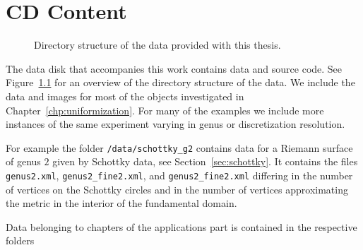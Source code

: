 \documentclass[Thesis]{subfiles}
\begin{document}
\chapter{CD Content}

\begin{figure}
\vspace{0.2cm}
\caption{Directory structure of the data provided with this thesis.}
\label{fig:dir_structure}
\end{figure}

The data disk that accompanies this work contains data and source code. 
See Figure~\ref{fig:dir_structure} for an overview of the directory structure of the data. 
We include the data and images for most of the objects investigated in Chapter~\ref{chp:uniformization}. 
For many of the examples we include more instances of the same experiment varying in genus or discretization resolution.

For example the folder {\tt /data/schottky\_g2} contains data for a Riemann surface of genus $2$ given by Schottky data, see Section~\ref{sec:schottky}.
It contains the files {\tt genus2.xml}, {\tt genus2\_fine2.xml}, and {\tt genus2\_fine2.xml} differing in the number of vertices on the Schottky circles and in the number of vertices approximating the metric in the interior of the fundamental domain.

Data belonging to chapters of the applications part is contained in the respective folders 
\end{document}
